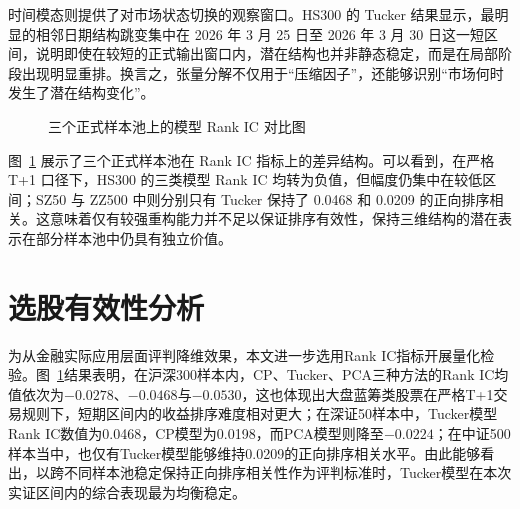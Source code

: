时间模态则提供了对市场状态切换的观察窗口。HS300 的 Tucker 结果显示，最明显的相邻日期结构跳变集中在 2026 年 3 月 25 日至 2026 年 3 月 30 日这一短区间，说明即使在较短的正式输出窗口内，潜在结构也并非静态稳定，而是在局部阶段出现明显重排。换言之，张量分解不仅用于“压缩因子”，还能够识别“市场何时发生了潜在结构变化”。

\begin{figure}[!t]
\centering
{}
\caption{三个正式样本池上的模型 Rank IC 对比图}
\label{fig:rankic}
\end{figure}

图~\ref{fig:rankic} 展示了三个正式样本池在 Rank IC 指标上的差异结构。可以看到，在严格 T+1 口径下，HS300 的三类模型 Rank IC 均转为负值，但幅度仍集中在较低区间；SZ50 与 ZZ500 中则分别只有 Tucker 保持了 0.0468 和 0.0209 的正向排序相关。这意味着仅有较强重构能力并不足以保证排序有效性，保持三维结构的潜在表示在部分样本池中仍具有独立价值。

\section{选股有效性分析}

为从金融实际应用层面评判降维效果，本文进一步选用Rank IC指标开展量化检验。图~\ref{fig:rankic}结果表明，在沪深300样本内，CP、Tucker、PCA三种方法的Rank IC均值依次为$-0.0278$、$-0.0468$与$-0.0530$，这也体现出大盘蓝筹类股票在严格T+1交易规则下，短期区间内的收益排序难度相对更大；在深证50样本中，Tucker模型Rank IC数值为0.0468，CP模型为0.0198，而PCA模型则降至$-0.0224$；在中证500样本当中，也仅有Tucker模型能够维持0.0209的正向排序相关水平。由此能够看出，以跨不同样本池稳定保持正向排序相关性作为评判标准时，Tucker模型在本次实证区间内的综合表现最为均衡稳定。

